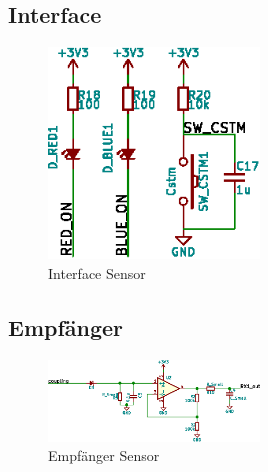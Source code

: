 
\subsection{Interface}
\label{subsec:hw:sensor:interface}

\begin{figure}[h!t]
    \centering
    \includegraphics[width=0.5\textwidth]{images/sensor-sch/sensor--sch--interface.eps}
    \caption[Sensor: Schema Interface]{Interface Sensor}
\end{figure}


\subsection{Empf\"anger}
\label{subsec:hw:sensor:receiver}

\begin{figure}[h!t]
    \centering
    \includegraphics[width=0.5\textwidth]{images/sensor-sch/sensor--sch--receiver.eps}
    \caption[Sensor: Schema Empf\"anger]{Empf\"anger Sensor}
\end{figure}

